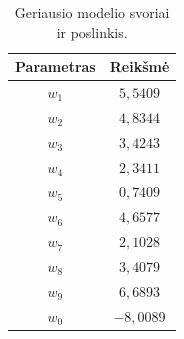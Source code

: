 \begin{table}[H]
    \centering
    \caption{Geriausio modelio svoriai ir poslinkis.}
    \begin{tabular}{|c|c|}
        \hline
        Parametras & Reikšmė \\
        \hline
        $w_1$ & $5{,}5409$ \\ \hline
        $w_2$ & $4{,}8344$ \\ \hline
        $w_3$ & $3{,}4243$ \\ \hline
        $w_4$ & $2{,}3411$ \\ \hline
        $w_5$ & $0{,}7409$ \\ \hline
        $w_6$ & $4{,}6577$ \\ \hline
        $w_7$ & $2{,}1028$ \\ \hline
        $w_8$ & $3{,}4079$ \\ \hline
        $w_9$ & $6{,}6893$ \\ \hline
        $w_0$ & $-8{,}0089$ \\ \hline
    \end{tabular}
    \label{tab:best_weights}
\end{table}